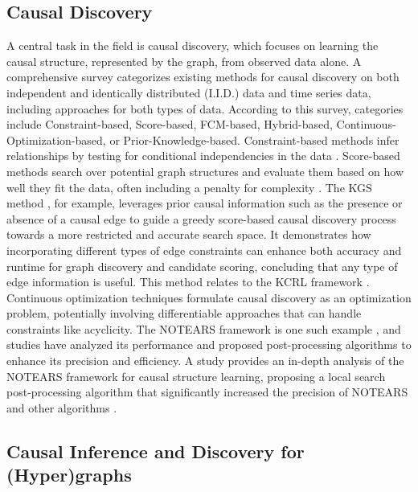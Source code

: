 {{\newpage

\subsection{Causal Discovery}

A central task in the field is causal discovery, which focuses on learning the causal structure, represented by the graph, from observed data alone. A comprehensive survey categorizes existing methods for causal discovery on both independent and identically distributed (I.I.D.) data and time series data, including approaches for both types of data. According to this survey, categories include Constraint-based, Score-based, FCM-based, Hybrid-based, Continuous-Optimization-based, or Prior-Knowledge-based. Constraint-based methods infer relationships by testing for conditional independencies in the data \cite{Glymour2019Review, Spirtes2000Causation, Eberhardt2017Introduction}. Score-based methods search over potential graph structures and evaluate them based on how well they fit the data, often including a penalty for complexity \cite{Chickering2002Optimal}. The KGS method \cite{hasan2022kcrl}, for example, leverages prior causal information such as the presence or absence of a causal edge to guide a greedy score-based causal discovery process towards a more restricted and accurate search space. It demonstrates how incorporating different types of edge constraints can enhance both accuracy and runtime for graph discovery and candidate scoring, concluding that any type of edge information is useful. This method relates to the KCRL framework \cite{hasan2022kcrl}. Continuous optimization techniques formulate causal discovery as an optimization problem, potentially involving differentiable approaches that can handle constraints like acyclicity. The NOTEARS framework is one such example \cite{Zheng2018Dags}, and studies have analyzed its performance and proposed post-processing algorithms to enhance its precision and efficiency. A study provides an in-depth analysis of the NOTEARS framework for causal structure learning, proposing a local search post-processing algorithm that significantly increased the precision of NOTEARS and other algorithms \cite{hasan2024surveycausaldiscoverymethods}.


\subsection{Causal Inference and Discovery for (Hyper)graphs}
\label{subsec:causal_graphs_hypergraphs}

}}
